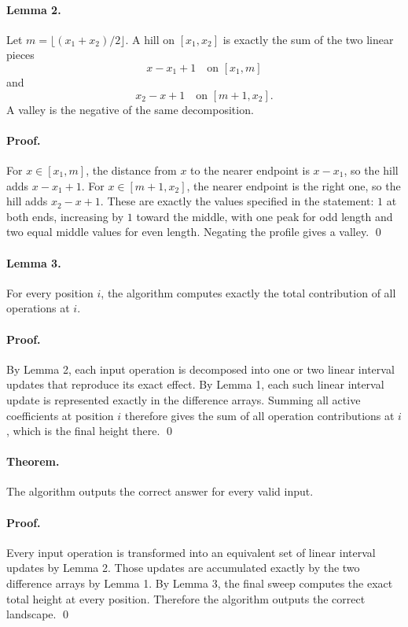 \documentclass[11pt]{article}
\begin{document}
\paragraph{Lemma 2.}
Let $m=\lfloor (x_1+x_2)/2 \rfloor$.
A hill on $[x_1,x_2]$ is exactly the sum of the two linear pieces
\[
    x-x_1+1 \quad \text{on } [x_1,m]
\]
and
\[
    x_2-x+1 \quad \text{on } [m+1,x_2].
\]
A valley is the negative of the same decomposition.

\paragraph{Proof.}
For $x \in [x_1,m]$, the distance from $x$ to the nearer endpoint is $x-x_1$, so the hill adds
$x-x_1+1$.
For $x \in [m+1,x_2]$, the nearer endpoint is the right one, so the hill adds $x_2-x+1$.
These are exactly the values specified in the statement:
$1$ at both ends, increasing by $1$ toward the middle, with one peak for odd length and two equal middle
values for even length.
Negating the profile gives a valley. \qed

\paragraph{Lemma 3.}
For every position $i$, the algorithm computes exactly the total contribution of all operations at $i$.

\paragraph{Proof.}
By Lemma 2, each input operation is decomposed into one or two linear interval updates that reproduce its
exact effect.
By Lemma 1, each such linear interval update is represented exactly in the difference arrays.
Summing all active coefficients at position $i$ therefore gives the sum of all operation contributions at
$i$, which is the final height there. \qed

\paragraph{Theorem.}
The algorithm outputs the correct answer for every valid input.

\paragraph{Proof.}
Every input operation is transformed into an equivalent set of linear interval updates by Lemma 2.
Those updates are accumulated exactly by the two difference arrays by Lemma 1.
By Lemma 3, the final sweep computes the exact total height at every position.
Therefore the algorithm outputs the correct landscape. \qed
\end{document}
